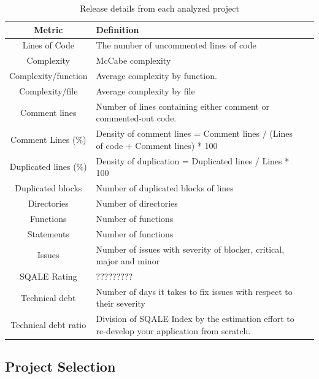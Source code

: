 \begin{table}[!hbt]
	\begin{center}
		\caption{Release details from each analyzed project}
		\label{tab:metrics_definition}
		\begin{tabular}{c| l l }
			\toprule
			\textbf{Metric} & \textbf{Definition} \\ \midrule
			Lines of Code & The number of uncommented lines of code    \\
			Complexity      & McCabe complexity    \\
			Complexity/function & Average complexity by function. \\
			Complexity/file & Average complexity by file \\
			Comment lines  & Number of lines containing either comment or commented-out code. \\
			Comment Lines (\%)   & Density of comment lines = Comment lines / (Lines of code + Comment lines) * 100    \\
			Duplicated lines (\%)     & Density of duplication = Duplicated lines / Lines * 100    \\
			Duplicated blocks   & Number of duplicated blocks of lines    \\
			Directories   & Number of directories    \\
			Functions            & Number of functions    \\
			Statements      & Number of functions   \\
			Issues    & Number of issues with severity of blocker, critical, major and minor   \\
		SQALE Rating   & ?????????    \\
			Technical debt    & Number of days it takes to fix issues with respect to their severity    \\
			Technical debt ratio   & Division of SQALE Index by the estimation effort to re-develop your application from scratch.    \\
		\end{tabular}
	\end{center}
\end{table}



\subsection{Project Selection}


